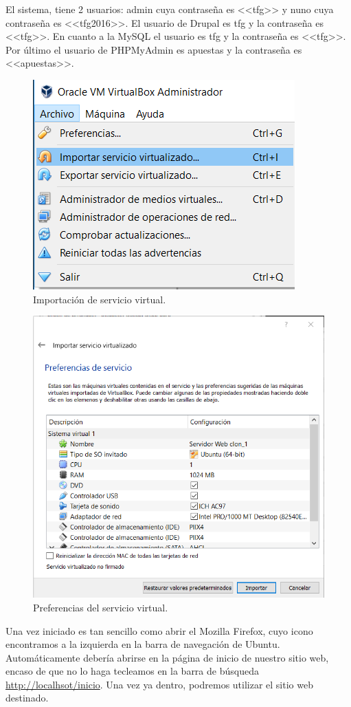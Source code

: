 El sistema, tiene 2 usuarios: admin cuya contraseña es <<tfg>> y nuno cuya contraseña es <<tfg2016>>. El usuario de Drupal es tfg y la contraseña es <<tfg>>.
En cuanto a la MySQL el usuario es tfg y la contraseña es <<tfg>>. 
Por último el usuario de PHPMyAdmin es apuestas y la contraseña es <<apuestas>>.

\begin{figure}
\centering
\includegraphics[width=.5\textwidth]{img/instalacion_user_servicio}
\caption{Importación de servicio virtual.}
\label{fig:SerVir}
\end{figure}

\begin{figure}
\centering
\includegraphics[width=.9\textwidth]{img/instalacion_user}
\caption{Preferencias del servicio virtual.}
\label{fig:NueMaqVir}
\end{figure}

Una vez iniciado es tan sencillo como abrir el Mozilla Firefox, cuyo icono encontramos a la izquierda en la barra de navegación de Ubuntu. Automáticamente debería abrirse en la página de inicio de nuestro sitio web, encaso de que no lo haga tecleamos en la barra de búsqueda \url{http://localhsot/inicio}. Una vez ya dentro, podremos utilizar el sitio web destinado.

